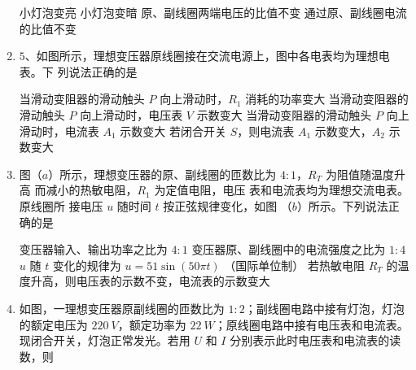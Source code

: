 \begin{enumerate}
\fourchoices
{小灯泡变亮}
{小灯泡变暗}
{原、副线圈两端电压的比值不变}
{通过原、副线圈电流的比值不变}


\item 
{}
$ 5 $、如图所示，理想变压器原线圈接在交流电源上，图中各电表均为理想电表。下
列说法正确的是  
\begin{figure}[h!]
\centering

\end{figure}

\fourchoices
{当滑动变阻器的滑动触头 $ P $ 向上滑动时，$ R_{1} $ 消耗的功率变大}
{当滑动变阻器的滑动触头 $ P $ 向上滑动时，电压表 $ V $ 示数变大}
{当滑动变阻器的滑动触头 $ P $ 向上滑动时，电流表 $ A_{1} $ 示数变大}
{若闭合开关 $ S $，则电流表 $ A_{1} $ 示数变大，$ A_{2} $ 示数变大}




\item 
{}
图（$ a $）所示，理想变压器的原、副线圈的匝数比为 $ 4:1 $，$ R_T $ 为阻值随温度升高
而减小的热敏电阻，$ R_{1} $ 为定值电阻，电压
表和电流表均为理想交流电表。原线圈所
接电压 $ u $ 随时间 $ t $ 按正弦规律变化，如图
（$ b $）所示。下列说法正确的是  
\begin{figure}[h!]
\centering
\begin{subfigure}{0.4\linewidth}
\centering
 
\caption{}\label{}
\end{subfigure}
\begin{subfigure}{0.4\linewidth}
\centering
 
\caption{}\label{}
\end{subfigure}
\end{figure}

\fourchoices
{变压器输入、输出功率之比为 $ 4:1 $}
{变压器原、副线圈中的电流强度之比为 $ 1:4 $}
{$ u $ 随 $ t $ 变化的规律为 $ u=51 \sin (50 \pi t) $ （国际单位制）}
{若热敏电阻 $ R_T $ 的温度升高，则电压表的示数不变，电流表的示数变大}




\item 
{}
如图，一理想变压器原副线圈的匝数比为 $ 1:2 $；副线圈电路中接有灯泡，灯泡的额定电压为
$ 220 \ V $，额定功率为 $ 22 \ W $；原线圈电路中接有电压表和电流表。现闭合开关，灯泡正常发光。若用
$ U $ 和 $ I $ 分别表示此时电压表和电流表的读数，则  
\begin{figure}[h!]
\centering

\end{figure}


\end{enumerate}

